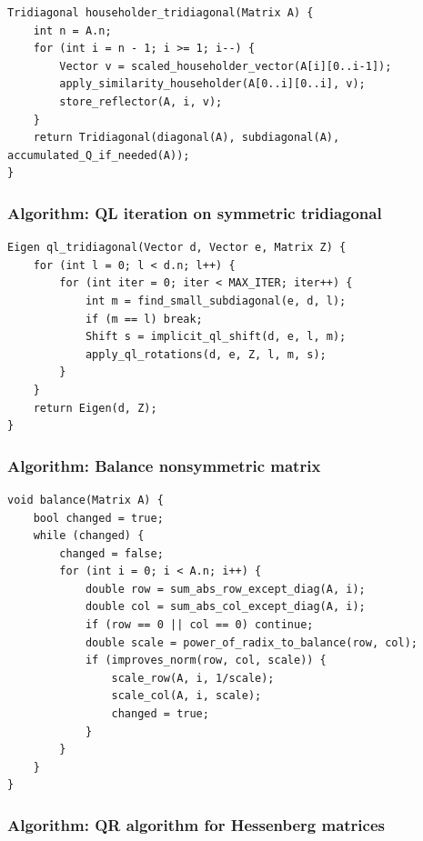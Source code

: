 \documentclass[11pt]{article}
\begin{document}
\begin{verbatim}
Tridiagonal householder_tridiagonal(Matrix A) {
    int n = A.n;
    for (int i = n - 1; i >= 1; i--) {
        Vector v = scaled_householder_vector(A[i][0..i-1]);
        apply_similarity_householder(A[0..i][0..i], v);
        store_reflector(A, i, v);
    }
    return Tridiagonal(diagonal(A), subdiagonal(A), accumulated_Q_if_needed(A));
}
\end{verbatim}

\subsubsection{Algorithm: QL iteration on symmetric tridiagonal}\label{algorithm-ql-iteration-on-symmetric-tridiagonal}

\begin{verbatim}
Eigen ql_tridiagonal(Vector d, Vector e, Matrix Z) {
    for (int l = 0; l < d.n; l++) {
        for (int iter = 0; iter < MAX_ITER; iter++) {
            int m = find_small_subdiagonal(e, d, l);
            if (m == l) break;
            Shift s = implicit_ql_shift(d, e, l, m);
            apply_ql_rotations(d, e, Z, l, m, s);
        }
    }
    return Eigen(d, Z);
}
\end{verbatim}

\subsubsection{Algorithm: Balance nonsymmetric matrix}\label{algorithm-balance-nonsymmetric-matrix}

\begin{verbatim}
void balance(Matrix A) {
    bool changed = true;
    while (changed) {
        changed = false;
        for (int i = 0; i < A.n; i++) {
            double row = sum_abs_row_except_diag(A, i);
            double col = sum_abs_col_except_diag(A, i);
            if (row == 0 || col == 0) continue;
            double scale = power_of_radix_to_balance(row, col);
            if (improves_norm(row, col, scale)) {
                scale_row(A, i, 1/scale);
                scale_col(A, i, scale);
                changed = true;
            }
        }
    }
}
\end{verbatim}

\subsubsection{Algorithm: QR algorithm for Hessenberg matrices}\label{algorithm-qr-algorithm-for-hessenberg-matrices}
\end{document}
